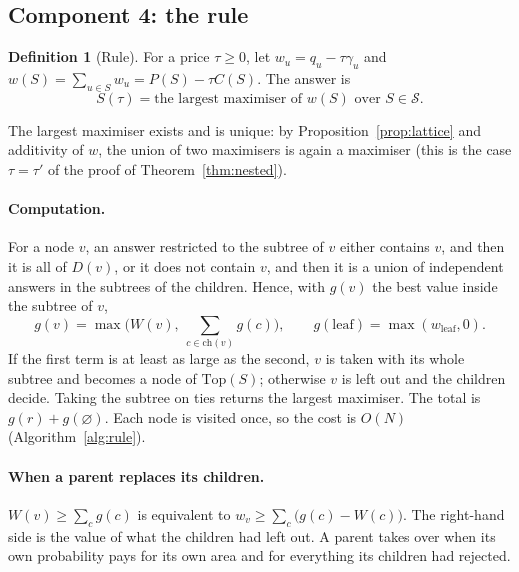 \documentclass[11pt,a4paper]{article}
\theoremstyle{definition}
\newtheorem{definition}{Definition}
\theoremstyle{remark}
\newcommand{\nul}{\varnothing}
\newcommand{\cS}{\mathcal{S}}
\newcommand{\Top}{\mathrm{Top}}
\begin{document}
\subsection{Component 4: the rule}
\begin{definition}[Rule]\label{def:rule}
For a price $\tau\ge0$, let $w_u=q_u-\tau\gamma_u$ and $w(S)=\sum_{u\in S}w_u=P(S)-\tau C(S)$. The answer is
\[
S(\tau)=\text{the largest maximiser of } w(S)\text{ over }S\in\cS .
\]
\end{definition}
The largest maximiser exists and is unique: by Proposition~\ref{prop:lattice} and additivity of $w$, the union of
two maximisers is again a maximiser (this is the case $\tau=\tau'$ of the proof of Theorem~\ref{thm:nested}).

\paragraph{Computation.} For a node $v$, an answer restricted to the subtree of $v$ either contains $v$, and then
it is all of $D(v)$, or it does not contain $v$, and then it is a union of independent answers in the subtrees of
the children. Hence, with $g(v)$ the best value inside the subtree of $v$,
\begin{equation}\label{eq:dp}
g(v)=\max\Big(W(v),\ \sum_{c\in\mathrm{ch}(v)}g(c)\Big),\qquad g(\text{leaf})=\max(w_{\text{leaf}},0).
\end{equation}
If the first term is at least as large as the second, $v$ is taken with its whole subtree and becomes a node of
$\Top(S)$; otherwise $v$ is left out and the children decide. Taking the subtree on ties returns the largest
maximiser. The total is $g(r)+g(\nul)$. Each node is visited once, so the cost is $O(N)$ (Algorithm~\ref{alg:rule}).

\paragraph{When a parent replaces its children.} $W(v)\ge\sum_cg(c)$ is equivalent to
$w_v\ge\sum_c\big(g(c)-W(c)\big)$. The right-hand side is the value of what the children had left out. A parent takes
over when its own probability pays for its own area and for everything its children had rejected.
\end{document}
